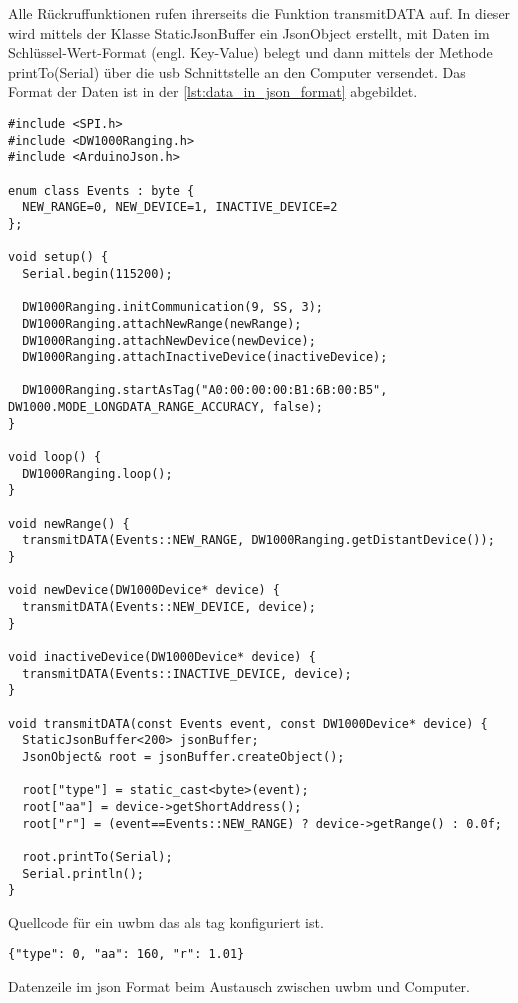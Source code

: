 Alle Rückruffunktionen rufen ihrerseits die Funktion transmitDATA auf. In dieser wird mittels der Klasse StaticJsonBuffer ein JsonObject erstellt, mit Daten im Schlüssel-Wert-Format (engl. Key-Value) belegt und dann mittels der Methode printTo(Serial) über die \Gls{usb} Schnittstelle an den Computer versendet. Das Format der Daten ist in der \autoref{lst:data_in_json_format} abgebildet.

\begin{listing}
	\begin{verbatim}
#include <SPI.h>
#include <DW1000Ranging.h>
#include <ArduinoJson.h>

enum class Events : byte {
  NEW_RANGE=0, NEW_DEVICE=1, INACTIVE_DEVICE=2
};

void setup() {
  Serial.begin(115200);
  
  DW1000Ranging.initCommunication(9, SS, 3);
  DW1000Ranging.attachNewRange(newRange);
  DW1000Ranging.attachNewDevice(newDevice);
  DW1000Ranging.attachInactiveDevice(inactiveDevice);

  DW1000Ranging.startAsTag("A0:00:00:00:B1:6B:00:B5", DW1000.MODE_LONGDATA_RANGE_ACCURACY, false);
}

void loop() {
  DW1000Ranging.loop();
}

void newRange() {
  transmitDATA(Events::NEW_RANGE, DW1000Ranging.getDistantDevice());
}

void newDevice(DW1000Device* device) {
  transmitDATA(Events::NEW_DEVICE, device);
}

void inactiveDevice(DW1000Device* device) {
  transmitDATA(Events::INACTIVE_DEVICE, device);
}

void transmitDATA(const Events event, const DW1000Device* device) {
  StaticJsonBuffer<200> jsonBuffer;
  JsonObject& root = jsonBuffer.createObject();

  root["type"] = static_cast<byte>(event);
  root["aa"] = device->getShortAddress();
  root["r"] = (event==Events::NEW_RANGE) ? device->getRange() : 0.0f;
  
  root.printTo(Serial);
  Serial.println();
}
	\end{verbatim}
	\unskip
	\caption{Quellcode für ein \Gls{uwbm} das als \Gls{tag} konfiguriert ist.}
	\label{lst:uwb_modul_as_tag}
\end{listing}


\begin{listing}
	\begin{verbatim}
{"type": 0, "aa": 160, "r": 1.01}
	\end{verbatim}
	\unskip
	\caption{Datenzeile im \Gls{json} Format beim Austausch zwischen \Gls{uwbm} und Computer.}
	\label{lst:data_in_json_format}
\end{listing}


